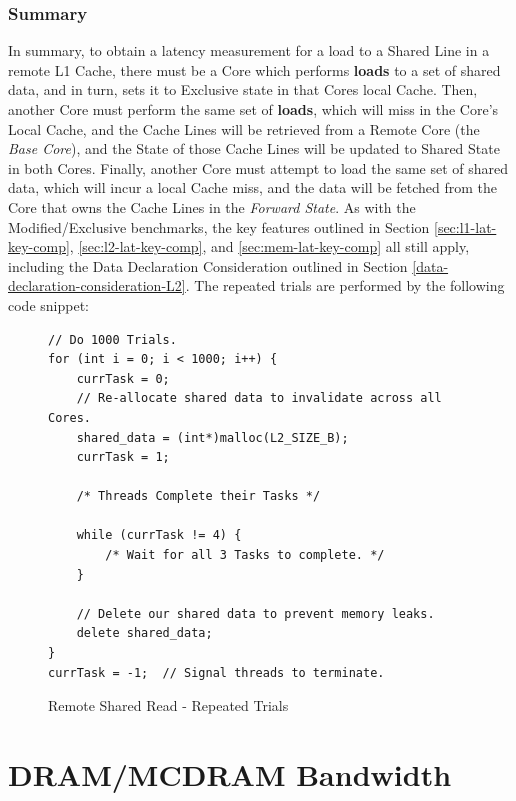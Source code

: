 \documentclass[bsc,frontabs,twoside,singlespacing,parskip,deptreport]{infthesis}     %
\begin{document}
\subsubsection{Summary}
In summary, to obtain a latency measurement for a load to a Shared Line in a remote L1 Cache, there must be a Core which performs \textbf{loads} to a set of shared data, and in turn, sets it to Exclusive state in that Cores local Cache. Then, another Core must perform the same set of \textbf{loads}, which will miss in the Core's Local Cache, and the Cache Lines will be retrieved from a Remote Core (the \emph{Base Core}), and the State of those Cache Lines will be updated to Shared State in both Cores. Finally, another Core must attempt to load the same set of shared data, which will incur a local Cache miss, and the data will be fetched from the Core that owns the Cache Lines in the \textit{Forward State}. As with the Modified/Exclusive benchmarks, the key features outlined in Section \ref{sec:l1-lat-key-comp}, \ref{sec:l2-lat-key-comp}, and \ref{sec:mem-lat-key-comp} all still apply, including the Data Declaration Consideration outlined in Section \ref{data-declaration-consideration-L2}. The repeated trials are performed by the following code snippet:
\begin{figure}[!h]
    \centering
    \begin{minipage}{0.8\textwidth}
    \begin{verbatim}
// Do 1000 Trials.
for (int i = 0; i < 1000; i++) {
    currTask = 0;
    // Re-allocate shared data to invalidate across all Cores.
    shared_data = (int*)malloc(L2_SIZE_B);
    currTask = 1;

    /* Threads Complete their Tasks */
        
    while (currTask != 4) {
        /* Wait for all 3 Tasks to complete. */
    }

    // Delete our shared data to prevent memory leaks.
    delete shared_data;
}
currTask = -1;  // Signal threads to terminate.
    \end{verbatim}
    \end{minipage}
    \caption{Remote Shared Read - Repeated Trials}
    \label{fig:remote-S-repeat}
\end{figure}

\newpage


\section{DRAM/MCDRAM Bandwidth}\label{mcdram-dram-benchmarks-bw}
\end{document}
